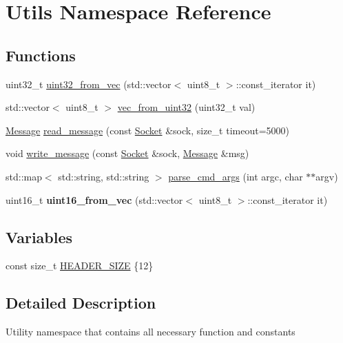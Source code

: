 \hypertarget{namespaceUtils}{}\section{Utils Namespace Reference}
\label{namespaceUtils}
\subsection*{Functions}
\begin{DoxyCompactItemize}
\item 
uint32\+\_\+t \hyperlink{namespaceUtils_a61c151a32493475c413d3b7964615d01}{uint32\+\_\+from\+\_\+vec} (std\+::vector$<$ uint8\+\_\+t $>$\+::const\+\_\+iterator it)
\item 
std\+::vector$<$ uint8\+\_\+t $>$ \hyperlink{namespaceUtils_a268ccd9cd3521e318e67a4c58cb95066}{vec\+\_\+from\+\_\+uint32} (uint32\+\_\+t val)
\item 
\hyperlink{structMessage}{Message} \hyperlink{namespaceUtils_a632dc21b737a7e31b5d5653d8fb927c6}{read\+\_\+message} (const \hyperlink{classSocket}{Socket} \&sock, size\+\_\+t timeout=5000)
\item 
void \hyperlink{namespaceUtils_a3a16defae746b5d1ef3f072da17ac377}{write\+\_\+message} (const \hyperlink{classSocket}{Socket} \&sock, \hyperlink{structMessage}{Message} \&msg)
\item 
std\+::map$<$ std\+::string, std\+::string $>$ \hyperlink{namespaceUtils_a50030bbcd5a72967f903913b18ac11dd}{parse\+\_\+cmd\+\_\+args} (int argc, char $\ast$$\ast$argv)
\item 
uint16\+\_\+t {\bfseries uint16\+\_\+from\+\_\+vec} (std\+::vector$<$ uint8\+\_\+t $>$\+::const\+\_\+iterator it)\hypertarget{namespaceUtils_a9aefb9599b00ed911043880504b3cc50}{}\label{namespaceUtils_a9aefb9599b00ed911043880504b3cc50}

\end{DoxyCompactItemize}
\subsection*{Variables}
\begin{DoxyCompactItemize}
\item 
const size\+\_\+t \hyperlink{namespaceUtils_aa3bfa39b8378ffaa8f0452645d5dd44f}{H\+E\+A\+D\+E\+R\+\_\+\+S\+I\+ZE} \{12\}
\end{DoxyCompactItemize}


\subsection{Detailed Description}
Utility namespace that contains all necessary function and constants 

